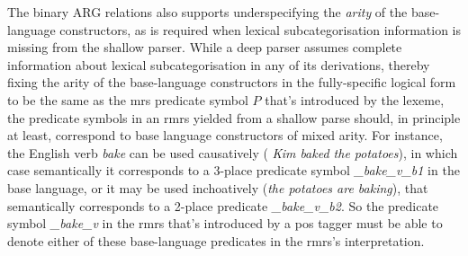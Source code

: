 The binary ARG relations also supports underspecifying the {\em arity}
of the base-language constructors, as is required when lexical
subcategorisation information is missing from the shallow parser.
While a deep parser assumes complete information about lexical
subcategorisation in any of its derivations, thereby fixing the arity
of the base-language constructors in the fully-specific logical form
to be the same as the {\sc mrs} predicate symbol $P$ that's introduced by
the lexeme, the predicate symbols in an {\sc rmrs} yielded from a
shallow parse should, in principle at least,
correspond to base language constructors of mixed arity.  For
instance, the English verb {\em bake} can be used causatively ({\em
  Kim baked the potatoes}), in which case semantically it corresponds
to a 3-place predicate symbol {\em \_bake\_v\_b1} in the base
language, or it may be used 
inchoatively ({\em the potatoes are baking}), that semantically
corresponds to a 2-place predicate {\em \_bake\_v\_b2}.  So the 
predicate symbol {\em 
  \_bake\_v} in the {\sc rmrs} that's introduced by a {\sc pos} tagger
must be able to denote either of these
base-language predicates in the {\sc rmrs}'s interpretation.

